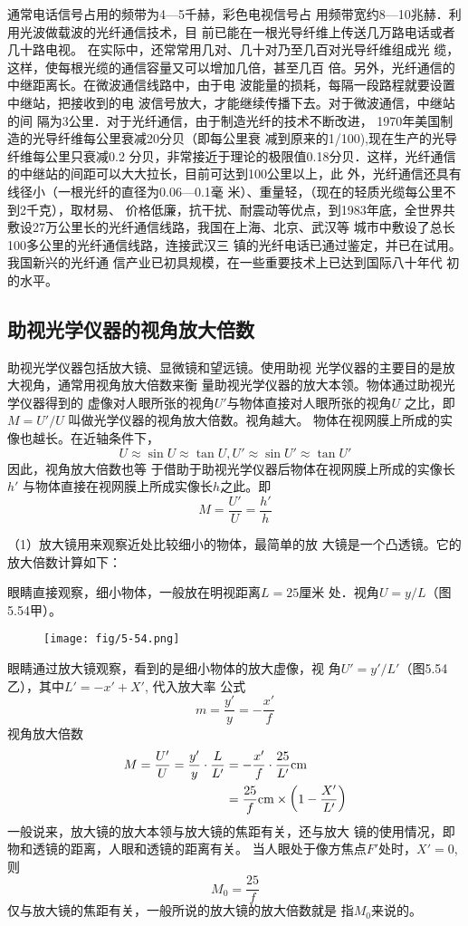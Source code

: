 通常电话信号占用的频带为4—5千赫，彩色电视信号占
用频带宽约8—10兆赫．利用光波做载波的光纤通信技术，目
前已能在一根光导纤维上传送几万路电话或者几十路电视。
在实际中，还常常用几对、几十对乃至几百对光导纤维组成光
缆，这样，使每根光缆的通信容量又可以增加几倍，甚至几百
倍。另外，光纤通信的中继距离长。在微波通信线路中，由于电
波能量的损耗，每隔一段路程就要设置中继站，把接收到的电
波信号放大，才能继续传播下去。对于微波通信，中继站的间
隔为3公里．对于光纤通信，由于制造光纤的技术不断改进，
1970年美国制造的光导纤维每公里衰减20分贝（即每公里衰
减到原来的1/100),现在生产的光导纤维每公里只衰减0.2
分贝，非常接近于理论的极限值0.18分贝．这样，光纤通信
的中继站的间距可以大大拉长，目前可达到100公里以上，此
外，光纤通信还具有线径小（一根光纤的直径为0.06—0.1毫
米）、重量轻，（现在的轻质光缆每公里不到2千克），取材易、
价格低廉，抗干扰、耐震动等优点，到1983年底，全世界共
敷设27万公里长的光纤通信线路，我国在上海、北京、武汉等
城市中敷设了总长100多公里的光纤通信线路，连接武汉三
镇的光纤电话已通过鉴定，并已在试用。我国新兴的光纤通
信产业已初具规模，在一些重要技术上已达到国际八十年代
初的水平。

\subsection{助视光学仪器的视角放大倍数}
助视光学仪器包括放大镜、显微镜和望远镜。使用助视
光学仪器的主要目的是放大视角，通常用视角放大倍数来衡
量助视光学仪器的放大本领。物体通过助视光学仪器得到的
虚像对人眼所张的视角$U'$与物体直接对人眼所张的视角$U$
之比，即$M=U'/U$
叫做光学仪器的视角放大倍数。视角越大。
物体在视网膜上所成的实像也越长。在近轴条件下，
\[U\approx \sin U\approx \tan U, U'\approx \sin U'\approx \tan U'\]
因此，视角放大倍数也等
于借助于助视光学仪器后物体在视网膜上所成的实像长$h'$
与物体直接在视网膜上所成实像长$h$之此。即
\[M=\frac{U'}{U}=\frac{h'}{h}\]

（1）放大镜用来观察近处比较细小的物体，最简单的放
大镜是一个凸透镜。它的放大倍数计算如下：

眼睛直接观察，细小物体，一般放在明视距离$L=25$厘米
处．视角$U=y/L$（图5.54甲）。

\begin{figure}[htp]\centering
    \texttt{[image: fig/5-54.png]}
        \caption{}
        \end{figure}

眼睛通过放大镜观察，看到的是细小物体的放大虚像，视
角$U'=y'/L'$（图5.54乙），其中$L'=-x'+X'$, 代入放大率
公式
\[m=\frac{y'}{y}=-\frac{x'}{f}\]
视角放大倍数
\[\begin{split}
    M=\frac{U'}{U}=\frac{y'}{y}\cdot \frac{L}{L'}&=-\frac{x'}{f}\cdot \frac{25}{L'}{\rm cm}\\
    &=\frac{25}{f}{\rm cm}\times \left(1-\frac{X'}{L'}\right)
\end{split}\]
一般说来，放大镜的放大本领与放大镜的焦距有关，还与放大
镜的使用情况，即物和透镜的距离，人眼和透镜的距离有关。
当人眼处于像方焦点$F'$处时，$X'=0$, 则
\[M_0=\frac{25}{f}\]
仅与放大镜的焦距有关，一般所说的放大镜的放大倍数就是
指$M_0$来说的。

